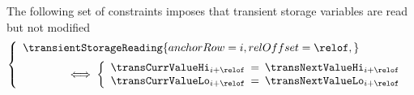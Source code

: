 The following set of constraints imposes that transient storage variables are read but not modified
\[
	\left\{ \begin{array}{l}
		\transientStorageReading {
			anchorRow = i      ,
			relOffset = \relof ,
		}
		\vspace{2mm} \\
		\qquad\qquad
		\iff
		\left\{ \begin{array}{lcl}
			\transCurrValueHi _{i + \relof} & \!\!\! = \!\!\! & \transNextValueHi _{i + \relof} \\
			\transCurrValueLo _{i + \relof} & \!\!\! = \!\!\! & \transNextValueLo _{i + \relof} \\ 
		\end{array} \right.
	\end{array} \right.
\]
